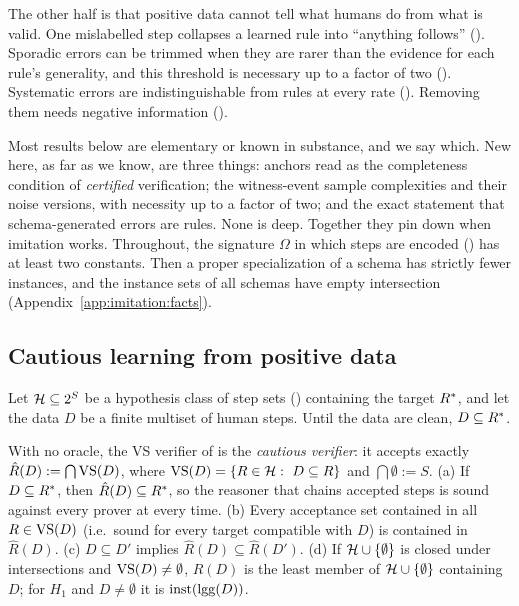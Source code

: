 The other half is that positive data cannot tell what humans do from what is valid. One mislabelled step collapses a learned rule into ``anything follows'' (). Sporadic errors can be trimmed when they are rarer than the evidence for each rule's generality, and this threshold is necessary up to a factor of two (). Systematic errors are indistinguishable from rules at every rate (). Removing them needs negative information ().

Most results below are elementary or known in substance, and we say which. New here, as far as we know, are three things: anchors read as the completeness condition of \emph{certified} verification; the witness-event sample complexities and their noise versions, with necessity up to a factor of two; and the exact statement that schema-generated errors are rules. None is deep. Together they pin down when imitation works. Throughout, the signature $\Omega$ in which steps are encoded () has at least two constants. Then a proper specialization of a schema has strictly fewer instances, and the instance sets of all schemas have empty intersection (Appendix~\ref{app:imitation:facts}).

\subsection{Cautious learning from positive data}\label{sec:imitation:cautious}

Let $\mathcal{H}\subseteq2^S$ be a hypothesis class of step sets () containing the target $R^{*}$, and let the data $D$ be a finite multiset of human steps. Until  the data are clean, $D\subseteq R^{*}$.

\begin{lemma}\label{def:imitation:cautious}\label{lem:imitation:cautious}
With no oracle, the VS verifier of  is the \emph{cautious verifier}: it accepts exactly $\hat R(D):=\bigcap\mathrm{VS}(D)$, where $\mathrm{VS}(D)=\{R\in\mathcal{H}:\ D\subseteq R\}$ and $\bigcap\emptyset:=S$.
\textup{(a)} If $D\subseteq R^{*}$, then $\hat R(D)\subseteq R^{*}$, so the reasoner that chains accepted steps is sound against every prover at every time.
\textup{(b)} Every acceptance set contained in all $R\in\mathrm{VS}(D)$ (i.e.\ sound for every target compatible with $D$) is contained in $\hat R(D)$.
\textup{(c)} $D\subseteq D'$ implies $\hat R(D)\subseteq\hat R(D')$.
\textup{(d)} If $\mathcal{H}\cup\{\emptyset\}$ is closed under intersections and $\mathrm{VS}(D)\neq\emptyset$, $\hat R(D)$ is the least member of $\mathcal{H}\cup\{\emptyset\}$ containing $D$; for $H_1$ and $D\neq\emptyset$ it is $\mathrm{inst}(\mathrm{lgg}(D))$.

\hfill{}\ 
\end{lemma}

